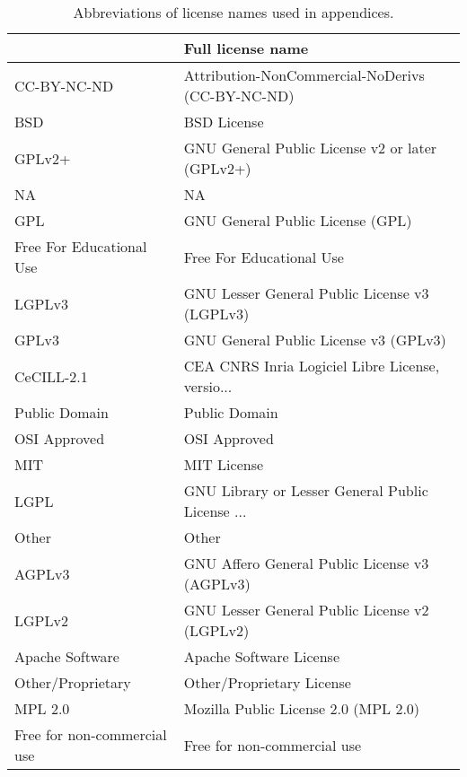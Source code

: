 \begin{table}
\centering
\caption{Abbreviations of license names used in appendices.}
\label{tab:keys-licenses}
\begin{tabular}{ll}
\toprule
{} &                                  Full license name \\
\midrule
CC-BY-NC-ND                  &   Attribution-NonCommercial-NoDerivs (CC-BY-NC-ND) \\
 BSD                         &                                        BSD License \\
GPLv2+                       &    GNU General Public License v2 or later (GPLv2+) \\
 NA                          &                                                 NA \\
GPL                          &                   GNU General Public License (GPL) \\
 Free For Educational Use    &                           Free For Educational Use \\
LGPLv3                       &      GNU Lesser General Public License v3 (LGPLv3) \\
GPLv3                        &              GNU General Public License v3 (GPLv3) \\
CeCILL-2.1                   &   CEA CNRS Inria Logiciel Libre License, versio... \\
 Public Domain               &                                      Public Domain \\
 OSI Approved                &                                       OSI Approved \\
 MIT                         &                                        MIT License \\
LGPL                         &   GNU Library or Lesser General Public License ... \\
 Other                       &                                              Other \\
AGPLv3                       &      GNU Affero General Public License v3 (AGPLv3) \\
LGPLv2                       &      GNU Lesser General Public License v2 (LGPLv2) \\
 Apache Software             &                            Apache Software License \\
 Other/Proprietary           &                          Other/Proprietary License \\
MPL 2.0                      &               Mozilla Public License 2.0 (MPL 2.0) \\
 Free for non-commercial use &                        Free for non-commercial use \\
\bottomrule
\end{tabular}
\end{table}

